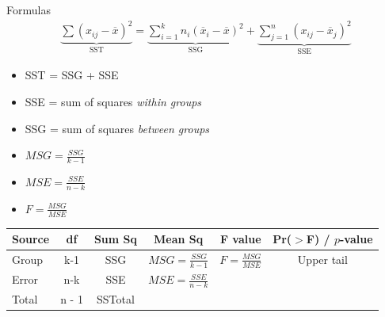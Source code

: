 \documentclass{beamer}
\begin{document}
%
%
%



%
%


\begin{frame}{Formulas}
\footnotesize
\begin{align*}
\underbrace{\sum (x_{ij} - \overline{x})^2}_{\text{SST}} = \underbrace{\sum_{i=1}^k n_i(\overline{x}_i - \overline{x})^2}_{\text{SSG}} +\underbrace{\sum_{j=1}^n (x_{ij} - \overline{x}_j)^2}_{\text{SSE}}
\end{align*}

\begin{itemize}
\item SST = SSG + SSE
\item SSE = sum of squares \textit{within groups}
\item SSG = sum of squares \textit{between groups}
\item $MSG = \frac{SSG}{k-1}$
\item $MSE = \frac{SSE}{n-k}$
\item $F = \frac{MSG}{MSE}$
\end{itemize}

{\footnotesize
\begin{table}[ht]
\centering
\def\arraystretch{1.5}
\begin{tabular}{lccccc}
  \hline
Source & df & Sum Sq & Mean Sq & F value & Pr($>$F) / $p$-value \\ 
  \hline
Group        & k-1 & SSG & $MSG = \frac{SSG}{k-1}$ & $F = \frac{MSG}{MSE}$ & Upper tail \\ 
  Error   & n-k & SSE & $MSE = \frac{SSE}{n-k}$ &  &  \\ 
   \hline
 Total & n - 1 & SSTotal & & & \\ \hline
\end{tabular}
\end{table}
}
\end{frame}
\end{document}
